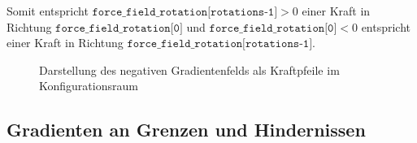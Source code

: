 Somit entspricht $\texttt{force\_field\_rotation[rotations-1]} > 0 $ einer Kraft in Richtung $\texttt{force\_field\_rotation[0]}$ und $ \texttt{force\_field\_rotation[0]} < 0 $ entspricht einer Kraft in Richtung $\texttt{force\_field\_rotation[rotations-1]}$.
\begin{figure}[H]
	\centering
	\footnotesize
	\centerline{}
	\vspace*{-0.23cm}
	\caption{Darstellung des negativen Gradientenfelds als Kraftpfeile im Konfigurationsraum}
\end{figure}

\subsection{Gradienten an Grenzen und Hindernissen}

